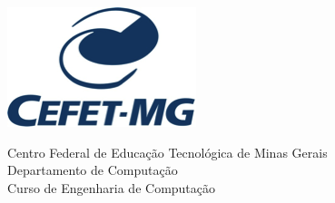 \begin{folhadeaprovacao} 

\begin{flushleft} 
\begin{minipage}{0.25\textwidth}
\includegraphics[scale=0.7]{figuras/logo.png} 
\end{minipage}
\hfill
\begin{minipage}{0.7\textwidth}
\begin{flushleft}
\begin{center}
Centro Federal de Educação Tecnológica de Minas Gerais \\
Departamento de Computação \\
Curso de Engenharia de Computação
\end{center}
\end{flushleft}
\end{minipage}
\end{flushleft}

\vfill

\vfill
\end{folhadeaprovacao}

